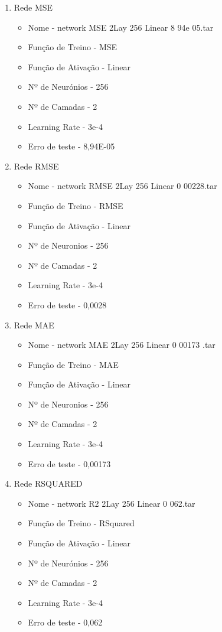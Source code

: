 \documentclass[10pt]{article}
\begin{document}
\begin{enumerate}
\item Rede MSE
  \begin{itemize}
    \item Nome - network MSE 2Lay 256 Linear 8 94e 05.tar
    \item Função de Treino - MSE
    \item Função de Ativação - Linear
    \item Nº de Neurónios - 256
    \item Nº de Camadas - 2
    \item Learning Rate - 3e-4
    \item Erro de teste - 8,94E-05
  \end{itemize}
  \vspace{2cm}
  \item Rede RMSE
  \begin{itemize}
    \item Nome - network RMSE 2Lay 256 Linear 0 00228.tar
    \item Função de Treino - RMSE
    \item Função de Ativação - Linear
    \item Nº de Neuronios - 256
    \item Nº de Camadas - 2
    \item Learning Rate - 3e-4
    \item Erro de teste - 0,0028
  \end{itemize}  
  \vspace{2cm}
  \item Rede MAE
  \begin{itemize} 
    \item Nome - network MAE 2Lay 256 Linear 0 00173 .tar
    \item Função de Treino - MAE
    \item Função de Ativação - Linear
    \item Nº de Neuronios - 256
    \item Nº de Camadas - 2
    \item Learning Rate - 3e-4
    \item Erro de teste - 0,00173
  \end{itemize}
  \vspace{2cm}
  \item Rede RSQUARED
  \begin{itemize}
    \item Nome - network R2 2Lay 256 Linear 0 062.tar
    \item Função de Treino - RSquared
    \item Função de Ativação - Linear
    \item Nº de Neurónios - 256
    \item Nº de Camadas - 2
    \item Learning Rate - 3e-4
    \item Erro de teste - 0,062   
  \end{itemize}
\end{enumerate}
\end{document}

